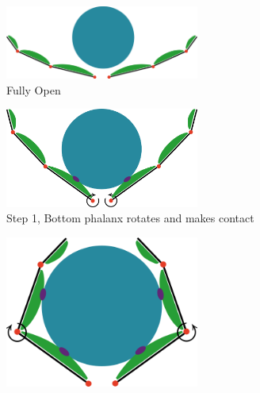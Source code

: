 \begin{figure}
    \centering
    \begin{subfigure}{.45\linewidth}
        \centering
    \includegraphics[width=0.7\textwidth]{Images/Underactuaction/FullyOpen.png}
\caption{Fully Open}
        \label{fig:UAFullyOpen}
    \end{subfigure}
    \begin{subfigure}{.45\linewidth}
        \centering
        \includegraphics[width=0.7\textwidth]{Images/Underactuaction/phase1png.png}

\caption{Step 1, Bottom phalanx rotates and makes contact}
        \label{fig:UAStep1}
    \end{subfigure}
\begin{subfigure}{.45\linewidth}
        \centering
    \includegraphics[width=0.7\textwidth]{Images/Underactuaction/phase2.png}


\end{subfigure}
\end{figure}
